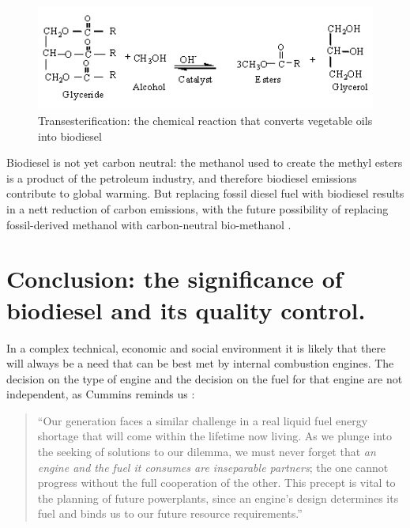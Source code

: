 \begin{figure}
	\centering
	\includegraphics[width=\textwidth]{Figures/reaction}
	\decoRule
	\caption[Transesterification]{Transesterification: the chemical reaction that converts vegetable oils into biodiesel}
	\label{fig:Transesterification}
\end{figure}

Biodiesel is not yet carbon neutral: the methanol used to create the methyl
esters is a product of the petroleum industry, and therefore biodiesel emissions
contribute to global warming. But replacing fossil diesel fuel with biodiesel
results in a nett reduction of carbon emissions, with the future possibility of
replacing fossil-derived methanol with carbon-neutral bio-methanol
\autocite{Shamsul2014}.

\section[The significance of biodiesel ]{Conclusion: the significance of
biodiesel and its quality control.}

In a complex technical, economic and social environment it is likely that there
will always be a need that can be best met by internal combustion engines. The
decision on the type of engine and the decision on the fuel for that engine are
not independent, as Cummins reminds us \autocite{Cummins1989}:

\begin{quotation}
``Our generation faces a similar challenge in a real liquid fuel energy shortage
that will come within the lifetime now living. As we plunge into the seeking of
solutions to our dilemma, we must never forget that \textit{an engine and the
fuel it consumes are inseparable partners}; the one cannot progress without the
full cooperation of the other. This precept is vital to the planning of future
powerplants, since an engine's design determines its fuel and binds us to our
future resource requirements.''
\end{quotation}

